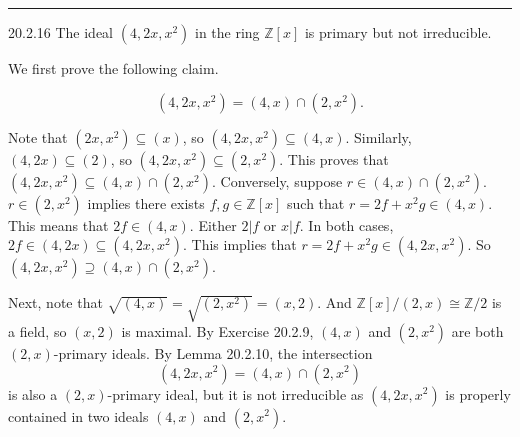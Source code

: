 \documentclass[letterpaper, 12pt]{article}
\begin{document}
\noindent\rule{7in}{2.8pt}
\begin{problem}{20.2.16}
The ideal \((4,2x,x^2)\) in the ring \(\mathbb{Z}[x]\) is primary but not irreducible.
\end{problem}
\begin{solution}
We first prove the following claim.
\begin{claim}
\[(4,2x,x^2)=(4,x)\cap (2,x^2).\]
\end{claim}
\begin{claimproof}
Note that \((2x,x^2)\subseteq (x)\), so \((4,2x,x^2)\subseteq (4,x)\). Similarly, \((4,2x)\subseteq (2)\), so \((4,2x,x^2)\subseteq (2,x^2)\). This proves that \((4,2x,x^2)\subseteq (4,x)\cap (2,x^2)\). Conversely, suppose \(r\in (4,x)\cap (2,x^2)\). \(r\in (2,x^2)\) implies there exists \(f,g\in \mathbb{Z}[x]\) such that \(r=2f+x^2g\in (4,x)\). This means that \(2f\in (4,x)\). Either \(2|f\) or \(x|f\). In both cases, \(2f\in (4,2x)\subseteq (4,2x,x^2)\). This implies that \(r=2f+x^2g\in (4,2x,x^2)\). So \((4,2x,x^2)\supseteq (4,x)\cap (2,x^2)\).
\end{claimproof}

Next, note that \(\sqrt{(4,x)}=\sqrt{(2,x^2)}=(x,2)\). And \(\mathbb{Z}[x]/(2,x)\cong \mathbb{Z}/2\) is a field, so \((x,2)\) is maximal. By Exercise 20.2.9, \((4,x)\) and \((2,x^2)\) are both \((2,x)\)-primary ideals. By Lemma 20.2.10, the intersection 
\[(4,2x,x^2)=(4,x)\cap (2,x^2)\]
is also a \((2,x)\)-primary ideal, but it is not irreducible as \((4,2x,x^2)\) is properly contained in two ideals \((4,x)\) and \((2,x^2)\). 
\end{solution}
\end{document}
